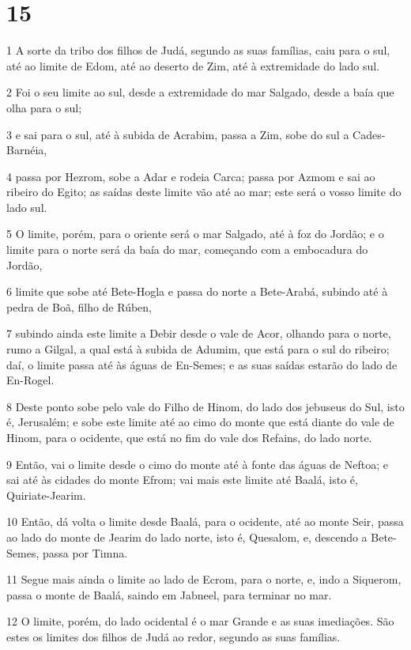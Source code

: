 \chapter{15}

\par 1 A sorte da tribo dos filhos de Judá, segundo as suas famílias, caiu para o sul, até ao limite de Edom, até ao deserto de Zim, até à extremidade do lado sul.
\par 2 Foi o seu limite ao sul, desde a extremidade do mar Salgado, desde a baía que olha para o sul;
\par 3 e sai para o sul, até à subida de Acrabim, passa a Zim, sobe do sul a Cades-Barnéia,
\par 4 passa por Hezrom, sobe a Adar e rodeia Carca; passa por Azmom e sai ao ribeiro do Egito; as saídas deste limite vão até ao mar; este será o vosso limite do lado sul.
\par 5 O limite, porém, para o oriente será o mar Salgado, até à foz do Jordão; e o limite para o norte será da baía do mar, começando com a embocadura do Jordão,
\par 6 limite que sobe até Bete-Hogla e passa do norte a Bete-Arabá, subindo até à pedra de Boã, filho de Rúben,
\par 7 subindo ainda este limite a Debir desde o vale de Acor, olhando para o norte, rumo a Gilgal, a qual está à subida de Adumim, que está para o sul do ribeiro; daí, o limite passa até às águas de En-Semes; e as suas saídas estarão do lado de En-Rogel.
\par 8 Deste ponto sobe pelo vale do Filho de Hinom, do lado dos jebuseus do Sul, isto é, Jerusalém; e sobe este limite até ao cimo do monte que está diante do vale de Hinom, para o ocidente, que está no fim do vale dos Refains, do lado norte.
\par 9 Então, vai o limite desde o cimo do monte até à fonte das águas de Neftoa; e sai até às cidades do monte Efrom; vai mais este limite até Baalá, isto é, Quiriate-Jearim.
\par 10 Então, dá volta o limite desde Baalá, para o ocidente, até ao monte Seir, passa ao lado do monte de Jearim do lado norte, isto é, Quesalom, e, descendo a Bete-Semes, passa por Timna.
\par 11 Segue mais ainda o limite ao lado de Ecrom, para o norte, e, indo a Siquerom, passa o monte de Baalá, saindo em Jabneel, para terminar no mar.
\par 12 O limite, porém, do lado ocidental é o mar Grande e as suas imediações. São estes os limites dos filhos de Judá ao redor, segundo as suas famílias.
